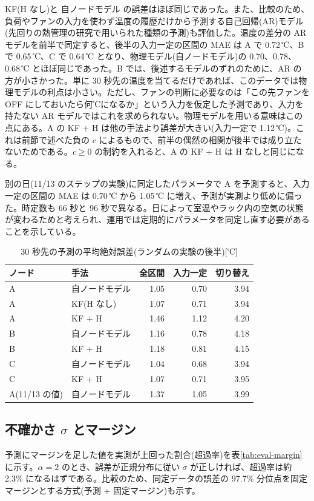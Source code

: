 KF(H なし)と 自ノードモデル の誤差はほぼ同じであった。また、比較のため、負荷やファンの入力を使わず温度の履歴だけから予測する自己回帰(AR)モデル(先回りの熱管理の研究\cite{coskun2008proactive}で用いられた種類の予測)も評価した。温度の差分の AR モデルを前半で同定すると、後半の入力一定の区間の MAE は A で 0.72\,℃、B で 0.65\,℃、C で 0.64\,℃ となり、物理モデル(自ノードモデル)の 0.70、0.78、0.68\,℃ とほぼ同じであった。B では、後述するモデルのずれのために、AR の方が小さかった。単に 30 秒先の温度を当てるだけであれば、このデータでは物理モデルの利点は小さい。ただし、ファンの判断に必要なのは「この先ファンを OFF にしておいたら何℃になるか」という入力を仮定した予測であり、入力を持たない AR モデルではこれを求められない。物理モデルを用いる意味はこの点にある。A の KF + H は他の手法より誤差が大きい(入力一定で 1.12\,℃)。これは前節で述べた負の $c$ によるもので、前半の偶然の相関が後半では成り立たないためである。$c \geq 0$ の制約を入れると、A の KF + H は H なしと同じになる。

別の日(11/13 のステップの実験)に同定したパラメータで A を予測すると、入力一定の区間の MAE は 0.70\,℃ から 1.05\,℃ に増え、予測が実測より低めに偏った。時定数も 66 秒と 96 秒で異なる。日によって室温やラック内の空気の状態が変わるためと考えられ、運用では定期的にパラメータを同定し直す必要があることを示している。

\begin{table}[tb]
  \centering
  \caption{30 秒先の予測の平均絶対誤差(ランダムの実験の後半)[℃]}
  \label{tab:eval-mae}
  \begin{tabular}{llrrr}
    \toprule
    ノード & 手法 & 全区間 & 入力一定 & 切り替え \\
    \midrule
    A & 自ノードモデル & 1.05 & 0.70 & 3.94 \\
    A & KF(H なし) & 1.07 & 0.71 & 3.94 \\
    A & KF + H & 1.46 & 1.12 & 4.20 \\
    B & 自ノードモデル & 1.16 & 0.78 & 4.18 \\
    B & KF + H & 1.18 & 0.81 & 4.15 \\
    C & 自ノードモデル & 1.04 & 0.68 & 3.94 \\
    C & KF + H & 1.07 & 0.71 & 3.95 \\
    A(11/13 の値) & 自ノードモデル & 1.37 & 1.05 & 3.99 \\
    \bottomrule
  \end{tabular}
\end{table}

\subsection{不確かさ $\sigma$ とマージン}
予測にマージンを足した値を実測が上回った割合(超過率)を表\ref{tab:eval-margin}に示す。$\alpha = 2$ のとき、誤差が正規分布に従い $\sigma$ が正しければ、超過率は約 2.3\% になるはずである。比較のため、同定データの誤差の 97.7\% 分位点を固定マージンとする方式(予測 + 固定マージン)も示す。

